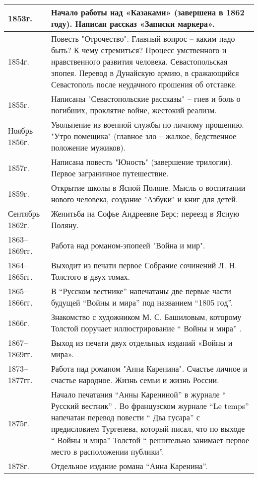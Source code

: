 \documentclass{article}
\begin{document}
\begin{longtable}[c]{|p{3cm}|p{8cm}|}
  \hline
  1853г. & Начало работы над «Казаками» (завершена в 1862 году). Написан рассказ «Записки маркера».\\
  \hline
  1854г. & Повесть "Отрочество". Главный вопрос – каким надо быть? К чему стремиться?
  Процесс умственного и нравственного развития человека.
  Севастопольская эпопея. Перевод в Дунайскую армию, в сражающийся Севастополь
  после неудачного прошения об отставке.\\
  \hline
  1855г. & Написаны "Севастопольские рассказы" – гнев и боль о погибших, проклятие войне, жестокий реализм.\\
  \hline
  Ноябрь 1856г. & Увольнение из военной службы по личному прошению. "Утро помещика"
  (главное зло – жалкое, бедственное положение мужиков).\\
  \hline
  1857г. & Написана повесть "Юность" (завершение трилогии). Первое заграничное путешествие.\\
  \hline
  1859г. & Открытие школы в Ясной Поляне. Мысль о воспитании нового человека,
  создание "Азбуки" и книг для детей.\\
  \hline
  Сентябрь 1862г. & Женитьба на Софье Андреевне Берс; переезд в Ясную Поляну.\\
  \hline
  1863–1869гг. & Работа над романом-эпопеей "Война и мир".\\
  \hline
  1864–1865гг. & Выходит из печати первое Собрание сочинений Л. H. Толстого в двух томах.\\
  \hline
  1865–1866гг. & В ``Русском вестнике'' напечатаны две первые части будущей ``Войны и мира''
  под названием ``1805 год''.\\
  \hline
  1866г. & Знакомство с художником М. С. Башиловым, которому Толстой поручает иллюстрирование `` Войны и мира'' .\\
  \hline
  1867–1869гг. & Выход из печати двух отдельных изданий «Войны и мира».\\
  \hline
  1873–1877гг. & Работа над романом "Анна Каренина". Счастье личное и счастье народное.
  Жизнь семьи и жизнь России.\\
  \hline
  1875г. & Начало печатания ``Анны Карениной''  в журнале `` Русский вестник'' . 
  Во французском журнале ``Le temps'' напечатан перевод повести `` Два гусара''  с предисловием Тургенева,
  который писал, что по выходе `` Войны и мира''  Толстой `` решительно
  занимает первое место в расположении публики''.\\
  \hline
  1878г. & Отдельное издание романа ``Анна Каренина''.\\

\end{longtable}
\end{document}
